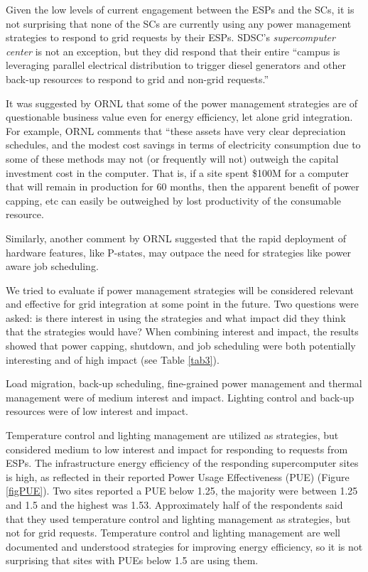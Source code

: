Given the low levels of current engagement between the ESPs and the SCs, it is not surprising that none of
the SCs are currently using any power management
strategies to respond to grid requests by their ESPs. SDSC's \textit{supercomputer center} is not an exception, but they did respond that their
entire ``campus is leveraging parallel electrical distribution to trigger
diesel generators and other back-up resources to respond to grid and
non-grid requests.''

It was suggested by ORNL that some of the power management strategies 
are of questionable business value even for energy efficiency, let alone grid integration.
For example, ORNL comments that ``these assets have very clear depreciation schedules, and the modest cost 
savings in terms of electricity consumption due to some of these methods may not (or frequently will not) 
outweigh the capital investment cost in the computer. That is, if a site spent \$100M for a computer that will 
remain in production for 60 months, then the 
apparent benefit of power capping, etc can easily be outweighed by lost productivity of the consumable resource.

Similarly, another comment by ORNL suggested that the rapid deployment of hardware features, like P-states,  may outpace the need for strategies like power aware job scheduling.

We tried to evaluate if power management strategies will be considered
relevant and effective for grid integration at some point in the future. Two
questions were asked: is there interest in using the strategies and what
impact did they think that the strategies would have? When combining
interest and impact, the results showed that power capping, shutdown, and
job scheduling were both potentially interesting and of high impact (see Table \ref{tab3}). 

Load migration, back-up
scheduling, fine-grained power management and thermal management were of medium
interest and impact. Lighting control and back-up resources were of low
interest and impact. 

Temperature control and lighting management are utilized as strategies, but considered medium to low interest and impact
for responding to requests from ESPs. 
The infrastructure energy efficiency of the responding supercomputer sites is high, as reflected in their reported
Power Usage Effectiveness (PUE) (Figure \ref{figPUE}). Two sites reported a PUE below 1.25, the majority were between 
1.25 and 1.5 and the highest was 1.53. Approximately half of the respondents said that they used 
temperature control and lighting management
as strategies, but not for grid requests. Temperature control and lighting management are well documented and understood
strategies for improving energy efficiency, so it is not surprising that sites with PUEs below 1.5 are using them.

